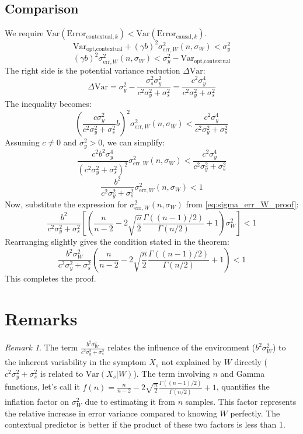\documentclass{article}
\theoremstyle{plain}
\theoremstyle{definition}
\theoremstyle{remark}
\newtheorem{remark}{Remark}[section]
\newcommand{\Var}{\text{Var}}
\newcommand{\g}{\Gamma} %
\begin{document}
\subsection{Comparison}
We require $\Var(\text{Error}_{\text{contextual}, k}) < \Var(\text{Error}_{\text{causal}, k})$.
\[ \Var_{\text{opt}, \text{contextual}} + (\gamma b)^2 \sigma_{\text{err},W}^2(n, \sigma_W) < \sigma_y^2 \]
\[ (\gamma b)^2 \sigma_{\text{err},W}^2(n, \sigma_W) < \sigma_y^2 - \Var_{\text{opt}, \text{contextual}} \]
The right side is the potential variance reduction $\Delta\Var$:
\[ \Delta\Var = \sigma_y^2 - \frac{\sigma_s^2 \sigma_y^2}{c^2\sigma_y^2 + \sigma_s^2} = \frac{c^2 \sigma_y^4}{c^2\sigma_y^2 + \sigma_s^2} \]
The inequality becomes:
\[ \left( \frac{c\sigma_y^2}{c^2\sigma_y^2 + \sigma_s^2} b \right)^2 \sigma_{\text{err},W}^2(n, \sigma_W) < \frac{c^2 \sigma_y^4}{c^2\sigma_y^2 + \sigma_s^2} \]
Assuming $c \neq 0$ and $\sigma_y^2 > 0$, we can simplify:
\[ \frac{c^2 b^2 \sigma_y^4}{(c^2\sigma_y^2 + \sigma_s^2)^2} \sigma_{\text{err},W}^2(n, \sigma_W) < \frac{c^2 \sigma_y^4}{c^2\sigma_y^2 + \sigma_s^2} \]
\[ \frac{b^2}{c^2\sigma_y^2 + \sigma_s^2} \sigma_{\text{err},W}^2(n, \sigma_W) < 1 \]
Now, substitute the expression for $\sigma_{\text{err},W}^2(n, \sigma_W)$ from \eqref{eq:sigma_err_W_proof}:
\[ \frac{b^2}{c^2\sigma_y^2 + \sigma_s^2} \left[ \left( \frac{n}{n-2} - 2 \sqrt{\frac{n}{2}} \frac{\g((n-1)/2)}{\g(n/2)} + 1 \right) \sigma_W^2 \right] < 1 \]
Rearranging slightly gives the condition stated in the theorem:
\[ \frac{b^2 \sigma_W^2}{c^2\sigma_y^2 + \sigma_s^2} \left( \frac{n}{n-2} - 2 \sqrt{\frac{n}{2}} \frac{\g((n-1)/2)}{\g(n/2)} + 1 \right) < 1 \]
This completes the proof.

\section{Remarks}

\begin{remark}
The term $\frac{b^2 \sigma_W^2}{c^2\sigma_y^2 + \sigma_s^2}$ relates the influence of the environment ($b^2 \sigma_W^2$) to the inherent variability in the symptom $X_s$ not explained by $W$ directly ($c^2\sigma_y^2 + \sigma_s^2$ is related to $\Var(X_s|W)$).
The term involving $n$ and Gamma functions, let's call it $f(n) = \frac{n}{n-2} - 2 \sqrt{\frac{n}{2}} \frac{\g((n-1)/2)}{\g(n/2)} + 1$, quantifies the inflation factor on $\sigma_W^2$ due to estimating it from $n$ samples. This factor represents the relative increase in error variance compared to knowing $W$ perfectly. The contextual predictor is better if the product of these two factors is less than 1.
\end{remark}
\end{document}

